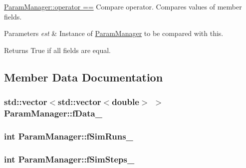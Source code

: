 \hyperlink{classParamManager_abcaeb584edbc8949339f3a71f0cae3ce}{Param\+Manager\+::operator ==} Compare operator. Compares values of member fields. 


\begin{DoxyParams}{Parameters}
{\em est} & Instance of \hyperlink{classParamManager}{Param\+Manager} to be compared with this. \\
\hline
\end{DoxyParams}
\begin{DoxyReturn}{Returns}
True if all fields are equal. 
\end{DoxyReturn}


\subsection{Member Data Documentation}
\subsubsection[{\texorpdfstring{f\+Data\+\_\+}{fData_}}]{\setlength{\rightskip}{0pt plus 5cm}std\+::vector$<$std\+::vector$<$double$>$ $>$ Param\+Manager\+::f\+Data\+\_\+\hspace{0.3cm}{\ttfamily [private]}}\hypertarget{classParamManager_a50cc8e69bb08c7f0b32d7614d5ade323}{}\label{classParamManager_a50cc8e69bb08c7f0b32d7614d5ade323}
\subsubsection[{\texorpdfstring{f\+Sim\+Runs\+\_\+}{fSimRuns_}}]{\setlength{\rightskip}{0pt plus 5cm}int Param\+Manager\+::f\+Sim\+Runs\+\_\+\hspace{0.3cm}{\ttfamily [private]}}\hypertarget{classParamManager_a3f867447d92ddea2da69014308ad0d16}{}\label{classParamManager_a3f867447d92ddea2da69014308ad0d16}
\subsubsection[{\texorpdfstring{f\+Sim\+Steps\+\_\+}{fSimSteps_}}]{\setlength{\rightskip}{0pt plus 5cm}int Param\+Manager\+::f\+Sim\+Steps\+\_\+\hspace{0.3cm}{\ttfamily [private]}}\hypertarget{classParamManager_a6020a91cb4adc8f9dcd6647353840599}{}\label{classParamManager_a6020a91cb4adc8f9dcd6647353840599}


